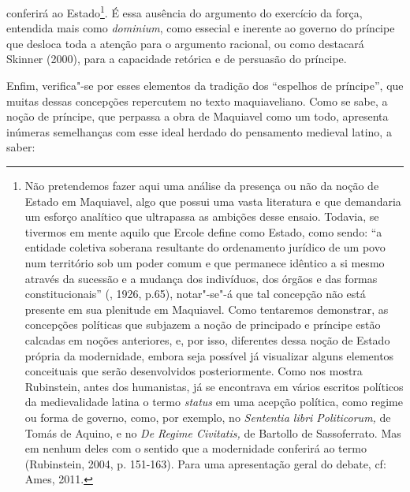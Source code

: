 conferirá ao Estado\footnote{Não pretendemos fazer aqui uma análise da
  presença ou não da noção de Estado em Maquiavel, algo que possui uma
  vasta literatura e que demandaria um esforço analítico que ultrapassa
  as ambições desse ensaio. Todavia, se tivermos em mente aquilo que
  Ercole define como Estado, como sendo: ``a entidade coletiva soberana
  resultante do ordenamento jurídico de um povo num território sob um
  poder comum e que permanece idêntico a si mesmo através da sucessão e
  a mudança dos indivíduos, dos órgãos e das formas constitucionais''
  (, 1926, p.65), notar"-se"-á que tal concepção não está presente
  em sua plenitude em Maquiavel. Como tentaremos demonstrar, as
  concepções políticas que subjazem a noção de principado e príncipe
  estão calcadas em noções anteriores, e, por isso, diferentes dessa
  noção de Estado própria da modernidade, embora seja possível já
  visualizar alguns elementos conceituais que serão desenvolvidos
  posteriormente. Como nos mostra Rubinstein, antes dos humanistas, já
  se encontrava em vários escritos políticos da medievalidade latina o
  termo \emph{status} em uma acepção política, como regime ou forma de
  governo, como, por exemplo, no \emph{Sententia libri Politicorum,} de
  Tomás de Aquino, e no \emph{De Regime Civitatis,} de Bartollo de
  Sassoferrato. Mas em nenhum deles com o sentido que a modernidade
  conferirá ao termo (Rubinstein, 2004, p. 151-163). Para uma
  apresentação geral do debate, cf: Ames, 2011.}. É essa ausência do
argumento do exercício da força, entendida mais como \emph{dominium},
como essecial e inerente ao governo do príncipe que desloca toda a
atenção para o argumento racional, ou como destacará Skinner (2000),
para a capacidade retórica e de persuasão do príncipe.

Enfim, verifica"-se por esses elementos da tradição dos ``espelhos de
príncipe'', que muitas dessas concepções repercutem no texto
maquiaveliano. Como se sabe, a noção de príncipe, que perpassa a obra de
Maquiavel como um todo, apresenta inúmeras semelhanças com esse ideal
herdado do pensamento medieval latino, a saber:

